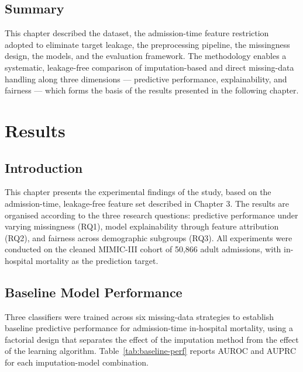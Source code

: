 \documentclass[12pt,a4paper]{report}
\begin{document}
\section{Summary}
This chapter described the dataset, the admission-time feature restriction adopted to eliminate target leakage, the preprocessing pipeline, the missingness design, the models, and the evaluation framework. The methodology enables a systematic, leakage-free comparison of imputation-based and direct missing-data handling along three dimensions --- predictive performance, explainability, and fairness --- which forms the basis of the results presented in the following chapter.


\chapter{Results}

\section{Introduction}
This chapter presents the experimental findings of the study, based on the admission-time, leakage-free feature set described in Chapter 3. The results are organised according to the three research questions: predictive performance under varying missingness (RQ1), model explainability through feature attribution (RQ2), and fairness across demographic subgroups (RQ3). All experiments were conducted on the cleaned MIMIC-III cohort of 50,866 adult admissions, with in-hospital mortality as the prediction target.


\section{Baseline Model Performance}
Three classifiers were trained across six missing-data strategies to establish baseline predictive performance for admission-time in-hospital mortality, using a factorial design that separates the effect of the imputation method from the effect of the learning algorithm. Table~\ref{tab:baseline-perf} reports AUROC and AUPRC for each imputation-model combination.
\end{document}
